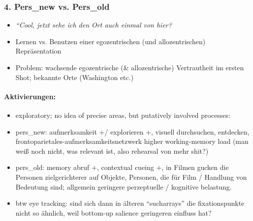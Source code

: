 \documentclass[10pt,a4paper,twocolumn]{article}
\begin{document}
\subsubsection{4. Pers\_new vs. Pers\_old }
\begin{itemize}
	\item \emph{``Cool, jetzt sehe ich den Ort auch einmal von hier?}
	\item Lernen vs. Benutzen einer egozentrischen (und allozentrischen) Repräsentation
	\item Problem: wachsende egozentrische (\& allozentrische) Vertrautheit
	im ersten Shot; bekannte Orte (Washington etc.)
\end{itemize}

\paragraph*{Aktivierungen:}
\begin{itemize}
	\item exploratory; no idea of precise areas, but putatively involved processes:
	\item pers\_new: aufmerksamkeit +/ explorieren +, visuell durchsuchen, entdecken,
	frontoparietales-aufmerksamkeitsnetzwerk higher working-memory load
	(man weiß noch nicht, was relevant ist, also rehearsal von mehr shit?)
	\item pers\_old: memory abruf +, contextual cueing +, in Filmen gucken die
	Personen zielgerichterer auf Objekte, Personen, die für Film / Handlung
	von Bedeutung sind; allgemein geringere perzeptuelle / kognitive belastung.
	\item btw eye tracking: sind sich dann in älteren ``sucharrays'' die fixationspunkte
	nicht so ähnlich, weil bottom-up salience geringeren einfluss hat?
\end{itemize}
\end{document}
